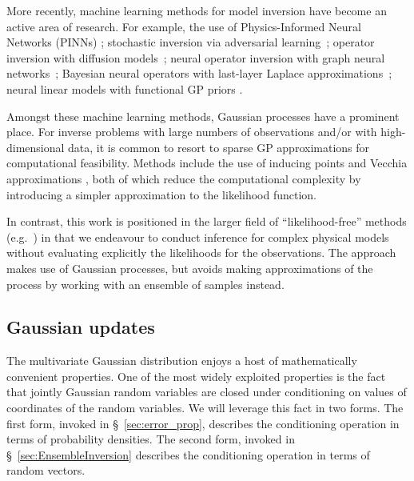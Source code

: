 More recently, machine learning methods for model inversion have become an active area of research.  For example, the use of Physics-Informed Neural Networks (PINNs) \cite{HePhysicsinformed2020,YangPhysicsInformed2020,ZhangLearning2020}; stochastic inversion via adversarial learning~\cite{XuAdversarial2019,BaoNumerical2020,ChuLearning2021}; operator inversion with diffusion models~\cite{SongSolving2022,JalalRobust2021}; 
neural operator inversion with graph neural networks~\cite{LiNeural2020};
Bayesian neural operators with last-layer Laplace approximations~\cite{MagnaniApproximate2022}; neural linear models with functional GP priors \cite{WatsonNeural2020}.

Amongst these machine learning methods, Gaussian processes have a prominent place.  For inverse problems with large numbers of observations and/or with high-dimensional data, it is common to resort to sparse GP approximations for computational feasibility.  Methods include the use of inducing points \cite{Bauer2016} and Vecchia approximations \cite{Katzfuss2020}, both of which reduce the computational complexity by introducing a simpler approximation to the likelihood function.

In contrast, this work is positioned in the larger field of ``likelihood-free'' methods (e.g.~\citet{CranmerFrontier2020}) in that we endeavour to conduct inference for complex physical models without evaluating explicitly the likelihoods for the observations.  The approach makes use of Gaussian processes, but avoids making approximations of the process by working with an ensemble of samples instead.

\subsection{Gaussian updates}
The multivariate Gaussian distribution enjoys a host of mathematically convenient properties.
One of the most widely exploited properties is the fact that jointly Gaussian random variables are closed under conditioning on values of coordinates of the random variables.
We will leverage this fact in two forms.
The first form, invoked in \S~\ref{sec:error_prop}, describes the conditioning operation in terms of probability densities.
The second form, invoked in \S~\ref{sec:EnsembleInversion} describes the conditioning operation in terms of random vectors.

